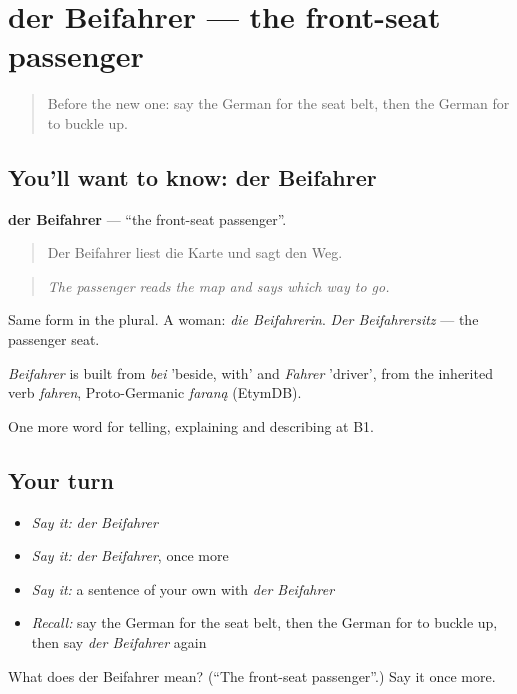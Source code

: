 \section[der Beifahrer]{der Beifahrer — the front-seat passenger}

\label{lesson:GE-C401-beifahrer}



\begin{quote}
Before the new one: say the German for the seat belt, then the German for to buckle up.
\end{quote}

\subsection*{You'll want to know: der Beifahrer}
\textbf{der Beifahrer} — \textquotedblleft{}the front-seat passenger\textquotedblright{}.

\begin{quote}
Der Beifahrer liest die Karte und sagt den Weg.
\end{quote}

\begin{quote}
\emph{The passenger reads the map and says which way to go.}
\end{quote}

Same form in the plural. A woman: \emph{die Beifahrerin}. \emph{Der Beifahrersitz} — the passenger seat.

\begin{cousinweb}
\emph{Beifahrer} is built from \emph{bei} 'beside, with' and \emph{Fahrer} 'driver', from the inherited verb \emph{fahren}, Proto-Germanic \emph{faraną} (EtymDB).
\end{cousinweb}

\begin{grammarlens}[title={What you've built}]
One more word for telling, explaining and describing at B1.
\end{grammarlens}

\subsection*{Your turn}
\begin{itemize}
\raggedright
  \item \emph{Say it:} \emph{der Beifahrer}
  \item \emph{Say it:} \emph{der Beifahrer}, once more
  \item \emph{Say it:} a sentence of your own with \emph{der Beifahrer}
  \item \emph{Recall:} say the German for the seat belt, then the German for to buckle up, then say \emph{der Beifahrer} again
\end{itemize}

\begin{tcolorbox}[breakable,colback=teal!4,colframe=teal!35!black,title={Before you move on}]
What does der Beifahrer mean? (\textquotedblleft{}The front-seat passenger\textquotedblright{}.) Say it once more.
\end{tcolorbox}
